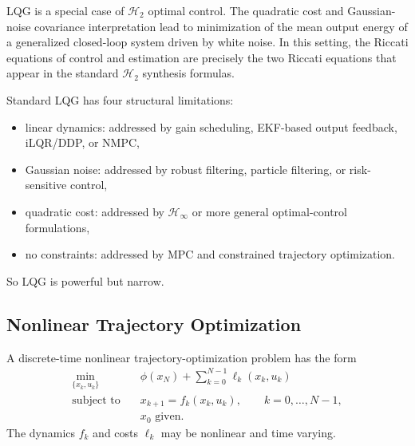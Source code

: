 \begin{remark}
	LQG is a special case of $\mathcal{H}_2$ optimal control. The quadratic cost and Gaussian-noise covariance interpretation lead to minimization of the mean output energy of a generalized closed-loop system driven by white noise. In this setting, the Riccati equations of control and estimation are precisely the two Riccati equations that appear in the standard $\mathcal{H}_2$ synthesis formulas.
\end{remark}

\begin{remark}
	Standard LQG has four structural limitations:
	\begin{itemize}
		\item linear dynamics: addressed by gain scheduling, EKF-based output feedback, iLQR/DDP, or NMPC,
		\item Gaussian noise: addressed by robust filtering, particle filtering, or risk-sensitive control,
		\item quadratic cost: addressed by $\mathcal{H}_\infty$ or more general optimal-control formulations,
		\item no constraints: addressed by MPC and constrained trajectory optimization.
	\end{itemize}
	So LQG is powerful but narrow.
\end{remark}

\subsection{Nonlinear Trajectory Optimization}
\label{sec:l8-nonlinear-trajectory-optimization}

\begin{definition}\label{def:l8-general-nonlinear-trajectory-optimization-problem}
	A discrete-time nonlinear trajectory-optimization problem has the form
	\begin{align*}
		\min_{\{x_k,u_k\}} \quad & \phi(x_N) + \sum_{k=0}^{N-1}\ell_k(x_k,u_k) \\
		\text{subject to}\quad & x_{k+1}=f_k(x_k,u_k), \qquad k=0,\dots,N-1, \\
		                       & x_0 \text{ given}.
	\end{align*}
	The dynamics $f_k$ and costs $\ell_k$ may be nonlinear and time varying.
\end{definition}

